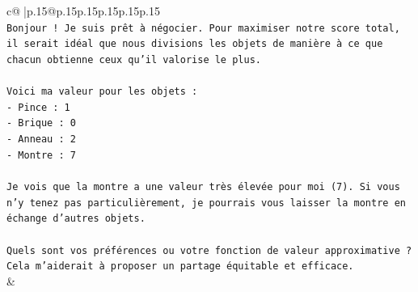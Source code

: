 \documentclass{article}
\begin{document}
{\begin{supertabular}{c@{$\;$}|p{.15\linewidth}@{}p{.15\linewidth}p{.15\linewidth}p{.15\linewidth}p{.15\linewidth}p{.15\linewidth}}
{{{\\ 
\texttt{Bonjour ! Je suis prêt à négocier. Pour maximiser notre score total, il serait idéal que nous divisions les objets de manière à ce que chacun obtienne ceux qu'il valorise le plus.} \\
\\ 
\texttt{Voici ma valeur pour les objets :} \\
\texttt{{-} Pince : 1} \\
\texttt{{-} Brique : 0} \\
\texttt{{-} Anneau : 2} \\
\texttt{{-} Montre : 7} \\
\\ 
\texttt{Je vois que la montre a une valeur très élevée pour moi (7). Si vous n'y tenez pas particulièrement, je pourrais vous laisser la montre en échange d'autres objets.} \\
\\ 
\texttt{Quels sont vos préférences ou votre fonction de valeur approximative ? Cela m'aiderait à proposer un partage équitable et efficace.} \\
            }
        }
    }
    & \\ \\


\end{supertabular}}
\end{document}
